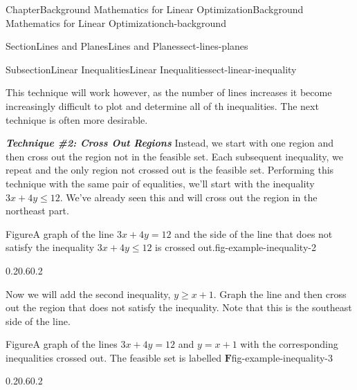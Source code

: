 \documentclass[oneside,10pt,]{book}
\newcommand{\alert}[1]{\textbf{\textit{#1}}}
\numberwithin{equation}{section}
\begin{document}
\begin{chapterptx}{Chapter}{Background Mathematics for Linear Optimization}{}{Background Mathematics for Linear Optimization}{}{}{ch-background}
\begin{sectionptx}{Section}{Lines and Planes}{}{Lines and Planes}{}{}{sect-lines-planes}
\begin{subsectionptx}{Subsection}{Linear Inequalities}{}{Linear Inequalities}{}{}{sect-linear-inequality}
\par
This technique will work however, as the number of lines increases it become increasingly difficult to plot and determine all of th inequalities. The next technique is often more desirable.%
\par
\alert{Technique \#2: Cross Out Regions} Instead, we start with one region and then cross out the region not in the feasible set.  Each subsequent inequality, we repeat and the only region not crossed out is the feasible set.  Performing this technique with the same pair of equalities, we'll start with the inequality \(3x+4y \leq 12\).  We've already seen this and will cross out the region in the northeast part.%
\begin{figureptx}{Figure}{A graph of the line \(3x+4y=12\) and the side of the line that does not satisfy the inequality \(3x+4y \leq 12\) is crossed out.}{fig-example-inequality-2}{}%
\begin{image}{0.2}{0.6}{0.2}{}%
%
\end{image}%
\tcblower
\end{figureptx}%
Now we will add the second inequality, \(y \geq x+1\). Graph the line and then cross out the region that does not satisfy the inequality. Note that this is the southeast side of the line.%
\begin{figureptx}{Figure}{A graph of the lines \(3x+4y=12\) and \(y=x+1\) with the corresponding inequalities crossed out. The feasible set is labelled \(\boldsymbol{F}\)}{fig-example-inequality-3}{}%
\begin{image}{0.2}{0.6}{0.2}{}%
\end{image}
\end{figureptx}
\end{subsectionptx}
\end{sectionptx}
\end{chapterptx}
\end{document}
